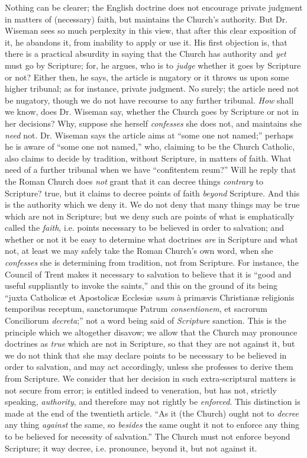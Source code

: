 Nothing can
be clearer; the English doctrine does not encourage private judgment in
matters of (necessary) faith, but maintains the Church's authority.
But Dr. Wiseman sees so much perplexity in this view, that after this
clear exposition of it, he abandons it, from inability to apply or use
it. His first objection is, that there is a practical absurdity in
saying that the Church has authority and \emph{yet} must go by
Scripture; for, he argues, who is to \emph{judge} whether it goes by
Scripture or not? Either then, he says, the article is nugatory or it
throws us upon some higher tribunal; as for instance, private judgment.
No surely; the article need not be nugatory, though we do not have
recourse to any further tribunal. \emph{How} shall we know, does Dr.
Wiseman say, whether the Church goes by Scripture or not in her
decisions? Why, suppose she herself \emph{confesses} she does not, and
maintains she \emph{need} not. Dr. Wiseman says the article aims at ``some one not named;'' perhaps he is aware of
``some one not
named,'' who, claiming to be the Church Catholic, also claims to decide
by tradition, without Scripture, in matters of faith. What need of a
further tribunal when we have ``confitentem reum?'' Will he reply that
the Roman Church does \emph{not} grant that it can decree things \emph{contrary}
to Scripture? true, but it claims to decree points of faith \emph{beyond}
Scripture. And this is the authority which we deny it. We do not deny
that many things may be true which are not in Scripture; but we deny
such are points of what is emphatically called the \emph{faith}, i.e.
points necessary to be believed in order to salvation; and whether or
not it be easy to determine what doctrines \emph{are} in Scripture and
what not, at least we may safely take the Roman Church's own word,
when she \emph{confesses} she is determining from tradition, not from
Scripture. For instance, the Council of Trent makes it necessary to
salvation to believe that it is ``good and useful suppliantly to invoke
the saints,'' and this on the ground of its being ``juxta Catholicæ
et Apostolicæ Ecclesiæ \emph{usum} à primævis Christianæ religionis
temporibus receptum, sanctorumque Patrum \emph{consentionem}, et
sacrorum Conciliorum \emph{decreta};'' not a word being said of \emph{Scripture}
sanction. This is the principle which we altogether disavow; we allow
that the Church may pronounce doctrines as \emph{true} which are not in
Scripture, so that they are not against it, but we do not think that she
may declare points to be necessary to be believed in order to salvation,
and may act accordingly, unless she professes to derive them
from Scripture. We consider that her decision in such extra-scriptural
matters is not secure from error; is entitled indeed to veneration, but
has not, strictly speaking, \emph{authority}, and therefore may not
rightly be \emph{enforced}. This distinction is made at the end of the
twentieth article. ``As it (the Church) ought not to \emph{decree} any
thing \emph{against} the same, so \emph{besides} the same ought it not
to enforce any thing to be believed for necessity of salvation.'' The
Church must not enforce beyond Scripture; it way decree, i.e. pronounce,
beyond it, but not against it.

